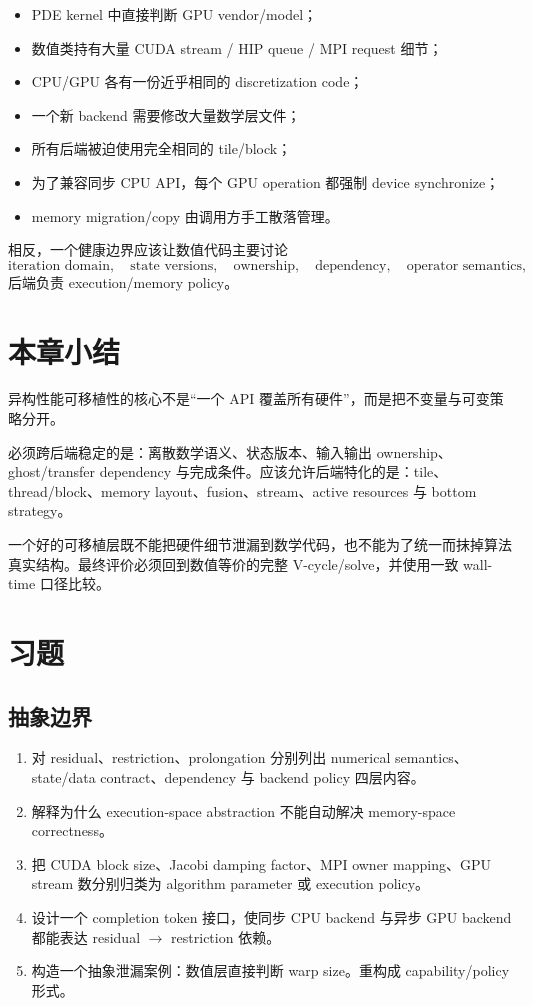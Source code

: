 \begin{itemize}
\item PDE kernel 中直接判断 GPU vendor/model；
\item 数值类持有大量 CUDA stream / HIP queue / MPI request 细节；
\item CPU/GPU 各有一份近乎相同的 discretization code；
\item 一个新 backend 需要修改大量数学层文件；
\item 所有后端被迫使用完全相同的 tile/block；
\item 为了兼容同步 CPU API，每个 GPU operation 都强制 device synchronize；
\item memory migration/copy 由调用方手工散落管理。
\end{itemize}

相反，一个健康边界应该让数值代码主要讨论
\begin{equation}
\text{iteration domain},
\quad
\text{state versions},
\quad
\text{ownership},
\quad
\text{dependency},
\quad
\text{operator semantics},
\end{equation}
后端负责 execution/memory policy。

\section{本章小结}

异构性能可移植性的核心不是“一个 API 覆盖所有硬件”，而是把不变量与可变策略分开。

必须跨后端稳定的是：离散数学语义、状态版本、输入输出 ownership、ghost/transfer dependency 与完成条件。应该允许后端特化的是：tile、thread/block、memory layout、fusion、stream、active resources 与 bottom strategy。

一个好的可移植层既不能把硬件细节泄漏到数学代码，也不能为了统一而抹掉算法真实结构。最终评价必须回到数值等价的完整 V-cycle/solve，并使用一致 wall-time 口径比较。

\section*{习题}

\subsection*{抽象边界}
\begin{enumerate}[label=\arabic*.]
\item 对 residual、restriction、prolongation 分别列出 numerical semantics、state/data contract、dependency 与 backend policy 四层内容。
\item 解释为什么 execution-space abstraction 不能自动解决 memory-space correctness。
\item 把 CUDA block size、Jacobi damping factor、MPI owner mapping、GPU stream 数分别归类为 algorithm parameter 或 execution policy。
\item 设计一个 completion token 接口，使同步 CPU backend 与异步 GPU backend 都能表达 residual $\rightarrow$ restriction 依赖。
\item 构造一个抽象泄漏案例：数值层直接判断 warp size。重构成 capability/policy 形式。
\end{enumerate}

